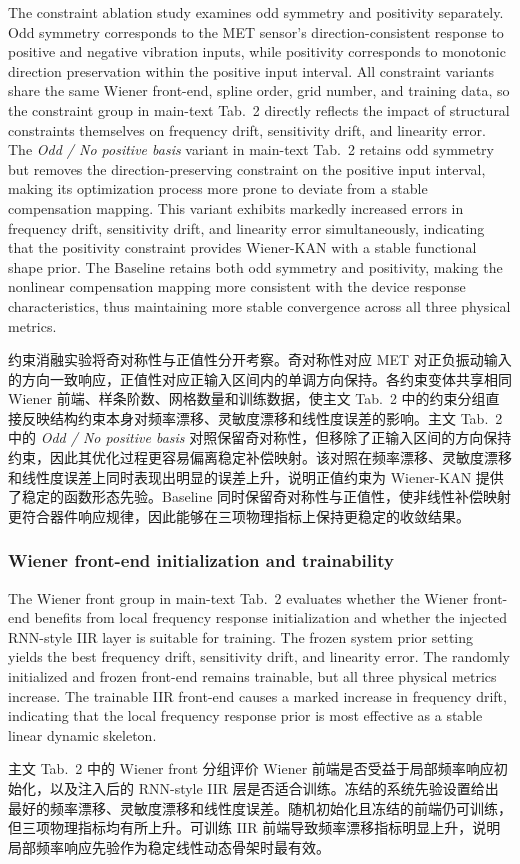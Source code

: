 \documentclass[sn-nature]{sn-jnl}
\newif\ifCNENEnglish
\newif\ifCNENBilingual
\newcommand{\CNEN}[2]{%
    \ifCNENBilingual
        #1%
        \if\relax\detokenize{#2}\relax\else\par #2\fi%
    \else
        \ifCNENEnglish
            #2%
        \else
            #1%
        \fi
    \fi
}
\begin{document}
\CNEN{约束消融实验将奇对称性与正值性分开考察。奇对称性对应 MET 对正负振动输入的方向一致响应，正值性对应正输入区间内的单调方向保持。各约束变体共享相同 Wiener 前端、样条阶数、网格数量和训练数据，使主文 Tab.~2 中的约束分组直接反映结构约束本身对频率漂移、灵敏度漂移和线性度误差的影响。主文 Tab.~2 中的 \textit{Odd / No positive basis} 对照保留奇对称性，但移除了正输入区间的方向保持约束，因此其优化过程更容易偏离稳定补偿映射。该对照在频率漂移、灵敏度漂移和线性度误差上同时表现出明显的误差上升，说明正值约束为 Wiener-KAN 提供了稳定的函数形态先验。Baseline 同时保留奇对称性与正值性，使非线性补偿映射更符合器件响应规律，因此能够在三项物理指标上保持更稳定的收敛结果。}{The constraint ablation study examines odd symmetry and positivity separately. Odd symmetry corresponds to the MET sensor's direction-consistent response to positive and negative vibration inputs, while positivity corresponds to monotonic direction preservation within the positive input interval. All constraint variants share the same Wiener front-end, spline order, grid number, and training data, so the constraint group in main-text Tab.~2 directly reflects the impact of structural constraints themselves on frequency drift, sensitivity drift, and linearity error. The \textit{Odd / No positive basis} variant in main-text Tab.~2 retains odd symmetry but removes the direction-preserving constraint on the positive input interval, making its optimization process more prone to deviate from a stable compensation mapping. This variant exhibits markedly increased errors in frequency drift, sensitivity drift, and linearity error simultaneously, indicating that the positivity constraint provides Wiener-KAN with a stable functional shape prior. The Baseline retains both odd symmetry and positivity, making the nonlinear compensation mapping more consistent with the device response characteristics, thus maintaining more stable convergence across all three physical metrics.%
}

\subsubsection{Wiener front-end initialization and trainability}

\CNEN{主文 Tab.~2 中的 Wiener front 分组评价 Wiener 前端是否受益于局部频率响应初始化，以及注入后的 RNN-style IIR 层是否适合训练。冻结的系统先验设置给出最好的频率漂移、灵敏度漂移和线性度误差。随机初始化且冻结的前端仍可训练，但三项物理指标均有所上升。可训练 IIR 前端导致频率漂移指标明显上升，说明局部频率响应先验作为稳定线性动态骨架时最有效。}{The Wiener front group in main-text Tab.~2 evaluates whether the Wiener front-end benefits from local frequency response initialization and whether the injected RNN-style IIR layer is suitable for training. The frozen system prior setting yields the best frequency drift, sensitivity drift, and linearity error. The randomly initialized and frozen front-end remains trainable, but all three physical metrics increase. The trainable IIR front-end causes a marked increase in frequency drift, indicating that the local frequency response prior is most effective as a stable linear dynamic skeleton.%
}
\end{document}
